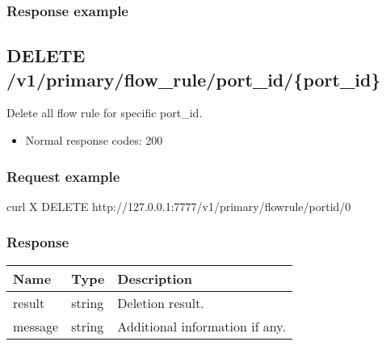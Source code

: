 \documentclass[a4paper,11pt,openany,oneside,english]{sphinxmanual}
\begin{document}
\subsubsection{Response example}
\label{\detokenize{api_ref/spp_primary:id26}}
\begin{sphinxVerbatim}[commandchars=\\\{\},formatcom=\footnotesize]
          
          
          
\end{sphinxVerbatim}


\subsection{DELETE /v1/primary/flow\_rule/port\_id/\{port\_id\}}
\label{\detokenize{api_ref/spp_primary:delete-v1-primary-flow-rule-port-id-port-id}}
Delete all flow rule for specific port\_id.
\begin{itemize}
\item {} 
Normal response codes: 200

\end{itemize}


\subsubsection{Request example}
\label{\detokenize{api_ref/spp_primary:id27}}
\begin{sphinxVerbatim}[commandchars=\\\{\},formatcom=\footnotesize]
 curl \PYGZhy{}X DELETE http://127.0.0.1:7777/v1/primary/flow\PYGZus{}rule/port\PYGZus{}id/0
\end{sphinxVerbatim}


\subsubsection{Response}
\label{\detokenize{api_ref/spp_primary:id28}}

\begin{savenotes}\sphinxattablestart
\centering
{}
\sphinxthecaptionisattop
{}\label{\detokenize{api_ref/spp_primary:id42}}\label{\detokenize{api_ref/spp_primary:table-spp-ctl-primary-flow-flush}}
\sphinxaftertopcaption
\begin{tabulary}{\linewidth}[t]{|T|T|T|}
\hline
\sphinxstyletheadfamily 
Name
&\sphinxstyletheadfamily 
Type
&\sphinxstyletheadfamily 
Description
\\
\hline
result
&
string
&
Deletion result.
\\
\hline
message
&
string
&
Additional information if any.
\\
\hline
\end{tabulary}
\par
\sphinxattableend\end{savenotes}
\end{document}
